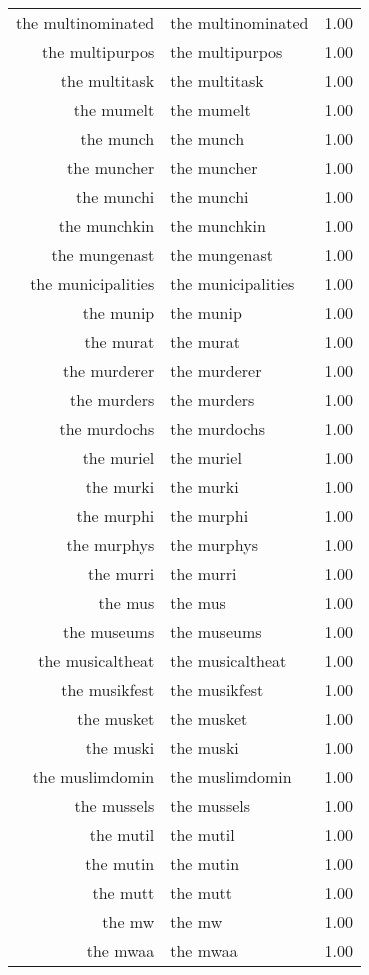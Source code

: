 \begin{table}[ht]
\begin{tabular}{rlr}
  the multinominated & the multinominated & 1.00 \\ 
  the multipurpos & the multipurpos & 1.00 \\ 
  the multitask & the multitask & 1.00 \\ 
  the mumelt & the mumelt & 1.00 \\ 
  the munch & the munch & 1.00 \\ 
  the muncher & the muncher & 1.00 \\ 
  the munchi & the munchi & 1.00 \\ 
  the munchkin & the munchkin & 1.00 \\ 
  the mungenast & the mungenast & 1.00 \\ 
  the municipalities & the municipalities & 1.00 \\ 
  the munip & the munip & 1.00 \\ 
  the murat & the murat & 1.00 \\ 
  the murderer & the murderer & 1.00 \\ 
  the murders & the murders & 1.00 \\ 
  the murdochs & the murdochs & 1.00 \\ 
  the muriel & the muriel & 1.00 \\ 
  the murki & the murki & 1.00 \\ 
  the murphi & the murphi & 1.00 \\ 
  the murphys & the murphys & 1.00 \\ 
  the murri & the murri & 1.00 \\ 
  the mus & the mus & 1.00 \\ 
  the museums & the museums & 1.00 \\ 
  the musicaltheat & the musicaltheat & 1.00 \\ 
  the musikfest & the musikfest & 1.00 \\ 
  the musket & the musket & 1.00 \\ 
  the muski & the muski & 1.00 \\ 
  the muslimdomin & the muslimdomin & 1.00 \\ 
  the mussels & the mussels & 1.00 \\ 
  the mutil & the mutil & 1.00 \\ 
  the mutin & the mutin & 1.00 \\ 
  the mutt & the mutt & 1.00 \\ 
  the mw & the mw & 1.00 \\ 
  the mwaa & the mwaa & 1.00 \\ 

\end{tabular}
\end{table}
